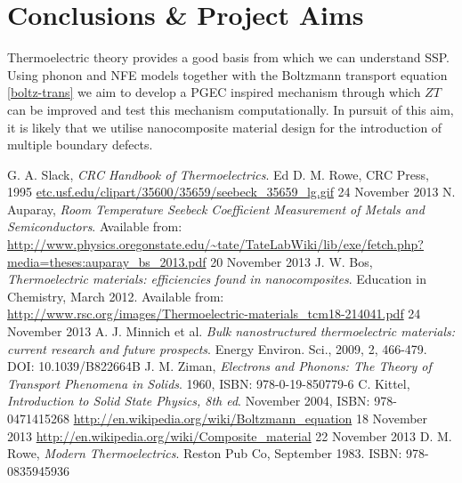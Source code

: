 \documentclass[a4paper,12pt]{article}
\begin{document}
\section{Conclusions \& Project Aims}
Thermoelectric theory provides a good basis from which we can
understand \ac{SSP}. Using phonon and \ac{NFE} models together with
the Boltzmann transport equation \eqref{boltz-trans} we aim to develop
a \ac{PGEC} inspired mechanism through which $ZT$ can be improved and
test this mechanism computationally. In pursuit of this aim, it is
likely that we utilise nanocomposite material design for the
introduction of multiple boundary defects.


\begin{thebibliography}{2}
G. A. Slack, \emph{CRC Handbook of Thermoelectrics}. Ed D. M. Rowe, CRC Press, 1995
\url{etc.usf.edu/clipart/35600/35659/seebeck_35659_lg.gif} 24 November
2013
N. Auparay, \emph{Room Temperature Seebeck Coefficient Measurement
of Metals and Semiconductors}. Available
from:
\url{http://www.physics.oregonstate.edu/~tate/TateLabWiki/lib/exe/fetch.php?media=theses:auparay_bs_2013.pdf} 20 November 2013
J. W. Bos, \emph{Thermoelectric materials: efficiencies found in
nanocomposites}. Education in Chemistry, March 2012. Available
from:
\url{http://www.rsc.org/images/Thermoelectric-materials_tcm18-214041.pdf} 24 November 2013
A. J. Minnich et al. \emph{Bulk nanostructured thermoelectric
materials: current research and future prospects}. Energy Environ.
Sci., 2009, 2, 466-479. DOI: 10.1039/B822664B
J. M. Ziman, \emph{Electrons and Phonons: The Theory of Transport
Phenomena in Solids}. 1960, ISBN: 978-0-19-850779-6
C. Kittel, \emph{Introduction to Solid State Physics, 8th ed}. November 2004, ISBN: 978-0471415268
\url{http://en.wikipedia.org/wiki/Boltzmann_equation} 18 November 2013
\url{http://en.wikipedia.org/wiki/Composite_material} 22 November 2013
D. M. Rowe, \emph{Modern Thermoelectrics}. Reston Pub Co, September
1983. ISBN: 978-0835945936
\end{thebibliography}
\end{document}
